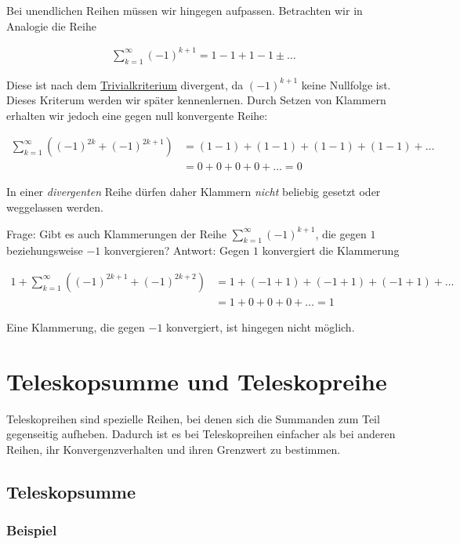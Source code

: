 \documentclass[fontsize=9pt,
               parskip=half-,
               DIV=14,
               listof=chapterentry,
               tocflat]{scrbook}
\begin{document}
Bei unendlichen Reihen müssen wir hingegen aufpassen. Betrachten wir in Analogie die Reihe

\begin{align*}
\sum _{k=1}^{\infty }(-1)^{k+1}=1-1+1-1\pm \ldots 
\end{align*}

Diese ist nach dem \href{https://de.wikibooks.org/wiki/Mathe\_für\_Nicht-Freaks:\_Trivialkriterium,\_Nullfolgenkriterium,\_Divergenzkriterium}
{Trivialkriterium} divergent, da $(-1)^{k+1}$ keine Nullfolge ist. Dieses Kriterum werden wir später kennenlernen. Durch Setzen von Klammern erhalten wir jedoch eine gegen null konvergente Reihe:

\begin{align*}
\sum _{k=1}^{\infty }\left((-1)^{2k}+(-1)^{2k+1}\right)&=(1-1)+(1-1)+(1-1)+(1-1)+\ldots \\[0.3em]&=0+0+0+0+\ldots =0
\end{align*}

In einer \emph{divergenten} Reihe dürfen daher Klammern \emph{nicht} beliebig gesetzt oder weggelassen werden.

Frage: Gibt es auch Klammerungen der Reihe $\sum _{k=1}^{\infty }(-1)^{k+1}$, die gegen $1$ beziehungsweise $-1$ konvergieren? Antwort: Gegen $1$ konvergiert die Klammerung

\begin{align*}
1+\sum _{k=1}^{\infty }\left((-1)^{2k+1}+(-1)^{2k+2}\right)&=1+(-1+1)+(-1+1)+(-1+1)+\ldots \\[0.3em]&=1+0+0+0+\ldots =1
\end{align*}

Eine Klammerung, die gegen $-1$ konvergiert, ist hingegen nicht möglich.

\chapter{Teleskopsumme und Teleskopreihe}

Teleskopreihen sind spezielle Reihen, bei denen sich die Summanden zum Teil gegenseitig aufheben. Dadurch ist es bei Teleskopreihen einfacher als bei anderen Reihen, ihr Konvergenzverhalten und ihren Grenzwert zu bestimmen.

\section{Teleskopsumme}

\subsection{Beispiel}
\end{document}
